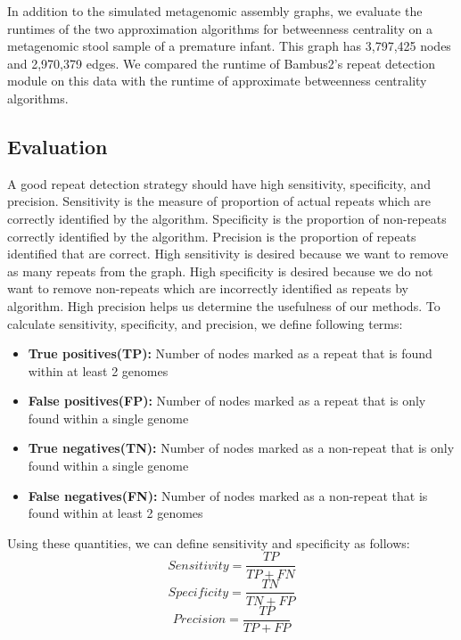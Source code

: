 \documentclass[runningheads,a4paper]{llncs}
\begin{document}
In addition to the simulated metagenomic assembly graphs, we evaluate the runtimes of the two approximation algorithms for betweenness centrality on a metagenomic stool sample of a premature infant\cite{morowitz2011strain}. This graph has 3,797,425 nodes and 2,970,379 edges. We compared the runtime of Bambus2's repeat detection module on this data with the runtime of approximate betweenness centrality algorithms.  

\subsection*{Evaluation}
A good repeat detection strategy should have high sensitivity, specificity, and precision. Sensitivity is the measure of proportion of actual repeats which are correctly identified by the algorithm. Specificity is the proportion of non-repeats correctly identified by the algorithm. Precision is the proportion of repeats identified that are correct. High sensitivity is desired because we want to remove as many repeats from the graph. High specificity is desired because we do not want to remove non-repeats which are incorrectly identified as repeats by algorithm. High precision helps us determine the usefulness of our methods. To calculate sensitivity, specificity, and precision, we define following terms:
\begin{itemize}
\item \textbf{True positives(TP):} Number of nodes marked as a repeat that is found within at least 2 genomes
\item \textbf{False positives(FP):} Number of nodes marked as a repeat that is only found within a single genome
\item \textbf{True negatives(TN):} Number of nodes marked as a non-repeat that is only found within a single genome
\item \textbf{False negatives(FN):} Number of nodes marked as a non-repeat that is found within at least 2 genomes
\end{itemize}

Using these quantities, we can define sensitivity and specificity as follows:
 $$Sensitivity = \frac{TP}{TP+FN}$$
 $$Specificity = \frac{TN}{TN+FP}$$
 $$Precision = \frac{TP}{TP + FP}$$
\end{document}
